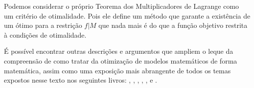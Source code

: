 \par Podemos considerar o próprio Teorema dos Multiplicadores de Lagrange como um critério de otimalidade. Pois ele define um método que garante a existência de um ótimo para a restrição $f|M$ que nada mais é do que a função objetivo restrita à condições de otimalidade. 
\par É possível encontrar outras descrições e argumentos que ampliem o leque da compreensão de como tratar da otimização de modelos matemáticos de forma matemática, assim como uma exposição mais abrangente de todos os temas expostos nesse texto nos seguintes livros: \cite{algebralinear1}, \cite{analise2}, \cite{algebralinear}, \cite{analisereal1}, \cite{analisereal2}, \cite{espacosmetricos} e \cite{analise1}. 